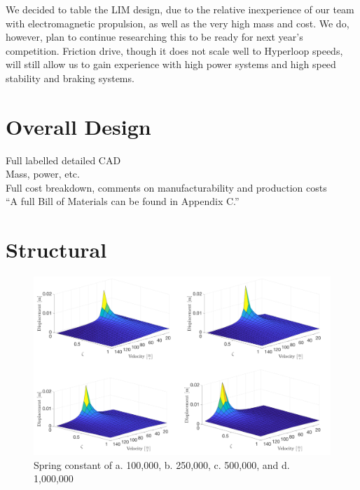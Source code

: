 \documentclass[main.tex]{subfiles}
\begin{document}
    We decided to table the LIM design, due to the relative inexperience of our team with electromagnetic propulsion, as well as the very high mass and cost. We do, however, plan to continue researching this to be ready for next year’s competition. Friction drive, though it does not scale well to Hyperloop speeds, will still allow us to gain experience with high power systems and high speed stability and braking systems.\\

    \section{Overall Design}
    Full labelled detailed CAD\\
    Mass, power, etc.\\
    Full cost breakdown, comments on manufacturability and production costs\\
    “A full Bill of Materials can be found in Appendix C.”

    \section{Structural}
    \begin{figure}
        \centering
        \includegraphics[width=\textwidth]{images/fig1}
        \caption{Spring constant of a. 100,000, b. 250,000, c. 500,000, and d. 1,000,000}
        \label{fig:spring1}
    \end{figure}
\end{document}
